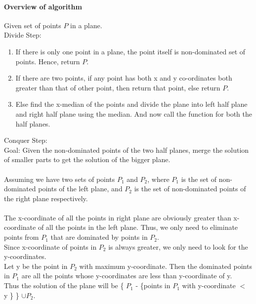 \documentclass[pdftex,a4paper,12pt]{report}
\begin{document}
\paragraph{Overview of algorithm} 
Given set of points $P$ in a plane. \\
Divide Step:
\begin{enumerate}
\item
If there is only one point in a plane, the point itself is non-dominated set of points. Hence, return $P$.
\item
If there are two points, if any point has both x and y co-ordinates both greater than that of other point, then return that point, else return $P$.
\item
Else find the x-median of the points and divide the plane into left half plane and right half plane using the median. And now call the function for both the half planes.\\
\end{enumerate}
Conquer Step:\\
Goal: Given the non-dominated points of the two half planes, merge the solution of smaller parts to get the solution of the bigger plane.\\\\
Assuming we have two sets of points $P_1$ and $P_2$, where $P_1$ is the set of non-dominated points of the left plane, and $P_2$ is the set of non-dominated points of the right plane respectively. \\\\
The x-coordinate of all the points in right plane are obviously greater than x-coordinate of all the points in the left plane. Thus, we only need to eliminate points from $P_1$ that are dominated by points in $P_2$.\\
Since x-coordinate of points in $P_2$ is always greater, we only need to look for the y-coordinates.\\
Let y be the point in $P_2$ with maximum y-coordinate. Then the dominated points in $P_1$ are all the points whose y-coordinates are less than y-coordinate of y.\\
Thus the solution of the plane will be \{ $P_1$ - \{points in $P_1$ with y-coordinate $<$ y \} \} $\cup P_2$. \\

\pagebreak
\end{document}
